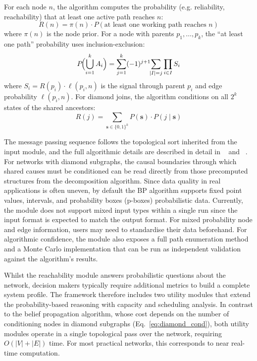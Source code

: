 \documentclass[twocolumn]{rps-esrel2026}
\begin{document}
For each node $n$, the algorithm computes the probability (e.g. reliability, reachability) that at least one active path reaches $n$:
\begin{equation}\label{eq:belief}
R(n) = \pi(n) \cdot P\!\left(\text{at least one working path reaches  } n\right)
\end{equation}
where $\pi(n)$ is the node prior. For a node with parents $p_1, \ldots, p_k$, the ``at least one path'' probability uses inclusion-exclusion:
\begin{equation}\label{eq:inclexcl}
P\!\Bigl(\bigcup_{i=1}^{k} A_i\Bigr) = \sum_{j=1}^{k} (-1)^{j+1} \!\!\sum_{|I|=j} \prod_{i \in I} S_i
\end{equation}
where $S_i = R(p_i) \cdot \ell(p_i, n)$ is the signal through parent $p_i$ and edge probability $\ell(p_i, n)$. For diamond joins, the algorithm conditions on all $2^k$ states of the shared ancestors:
\begin{equation}\label{eq:diamond_cond}
R(j) = \sum_{\mathbf{s} \in \{0,1\}^k} P(\mathbf{s}) \cdot P(j \mid \mathbf{s})
\end{equation}

The message passing sequence follows the topological sort inherited from the input module, and the full algorithmic details are described in detail in ~\cite{infoprop2026} and ~\cite{infoprop2026_julia}. For networks with diamond subgraphs, the causal boundaries through which shared causes must be conditioned can be read directly from those precomputed structures from the decomposition algorithm. Since data quality in real applications is often uneven, by default the BP algorithm supports fixed point values, intervals, and probability boxes (p-boxes) probabilistic data. 
Currently, the module does not support mixed input types within a single run since the input format is expected to match the output format. For mixed probability node and edge information, users may need to standardise their data beforehand. For algorithmic confidence, the module also exposes a full path enumeration method and a Monte Carlo implementation that can be run as independent validation against the algorithm’s results.

Whilst the reachability module answers probabilistic questions about the network, decision makers typically require additional metrics to build a complete system profile. The framework therefore includes two utility modules that extend the probability-based reasoning with capacity and scheduling analysis. In contrast to the belief propagation algorithm, whose cost depends on the number of conditioning nodes in diamond subgraphs (Eq.~\ref{eq:diamond_cond}), both utility modules operate in a single topological pass over the network, requiring $O(|V| + |E|)$ time. For most practical networks, this corresponds to near real-time computation.
\end{document}

